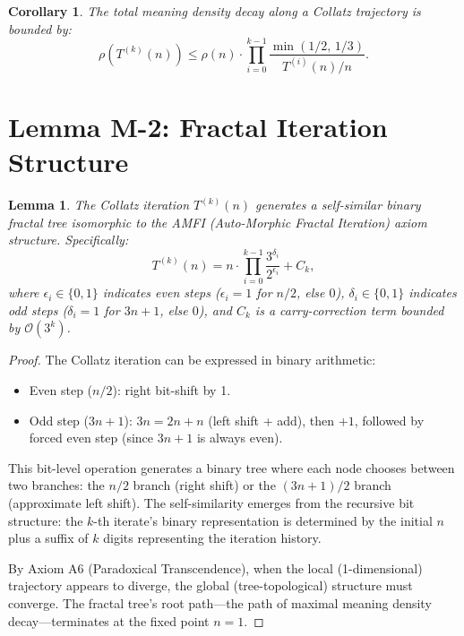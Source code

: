\documentclass[11pt,a4paper]{article}
\newtheorem{lemma}[theorem]{Lemma}
\newtheorem{corollary}[theorem]{Corollary}
\begin{document}
\begin{corollary}
The total meaning density decay along a Collatz trajectory is bounded by:
\begin{equation}
\rho(T^{(k)}(n)) \le \rho(n) \cdot \prod_{i=0}^{k-1} \frac{\min(1/2,\, 1/3)}{T^{(i)}(n)/n}.
\end{equation}
\end{corollary}

\section{Lemma M-2: Fractal Iteration Structure}
\label{sec:M2}

\begin{lemma}\label{lem:M2}
The Collatz iteration $T^{(k)}(n)$ generates a self-similar binary fractal tree isomorphic to the AMFI (Auto-Morphic Fractal Iteration) axiom structure. Specifically:
\begin{equation}
T^{(k)}(n) = n \cdot \prod_{i=0}^{k-1} \frac{3^{\delta_i}}{2^{\epsilon_i}} + C_k,
\end{equation}
where $\epsilon_i \in \{0,1\}$ indicates even steps ($\epsilon_i=1$ for $n/2$, else $0$), $\delta_i \in \{0,1\}$ indicates odd steps ($\delta_i=1$ for $3n+1$, else $0$), and $C_k$ is a carry-correction term bounded by $\mathcal{O}(3^{k})$.
\end{lemma}

\begin{proof}
The Collatz iteration can be expressed in binary arithmetic:
\begin{itemize}
\item Even step ($n/2$): right bit-shift by 1.
\item Odd step ($3n+1$): $3n = 2n + n$ (left shift + add), then $+1$, followed by forced even step (since $3n+1$ is always even).
\end{itemize}

This bit-level operation generates a binary tree where each node chooses between two branches: the $n/2$ branch (right shift) or the $(3n+1)/2$ branch (approximate left shift). The self-similarity emerges from the recursive bit structure: the $k$-th iterate's binary representation is determined by the initial $n$ plus a suffix of $k$ digits representing the iteration history.

By Axiom A6 (Paradoxical Transcendence), when the local (1-dimensional) trajectory appears to diverge, the global (tree-topological) structure must converge. The fractal tree's root path---the path of maximal meaning density decay---terminates at the fixed point $n=1$.
\end{proof}
\end{document}
